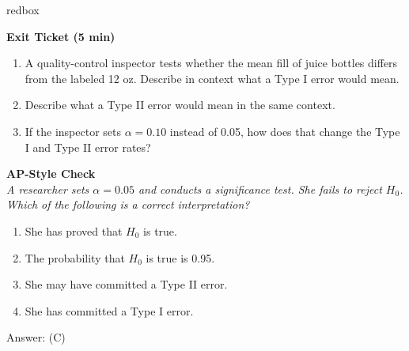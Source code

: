 \documentclass[10pt]{article}
\begin{document}
\begin{skillbox}{redbox}
\begin{minipage}[t]{0.48\linewidth}
    \textbf{Exit Ticket (5 min)}
    \begin{enumerate}
        \item A quality-control inspector tests whether the mean fill of juice bottles
              differs from the labeled 12 oz. Describe in context what a Type I error
              would mean.
        \item Describe what a Type II error would mean in the same context.
        \item If the inspector sets $\alpha = 0.10$ instead of 0.05, how does that
              change the Type I and Type II error rates?
    \end{enumerate}
\end{minipage}
\hfill
\begin{minipage}[t]{0.48\linewidth}
    \textbf{AP-Style Check}\\
    \textit{A researcher sets $\alpha = 0.05$ and conducts a significance test. She
    fails to reject $H_0$. Which of the following is a correct interpretation?}
    \begin{enumerate}[label=(\Alph*)]
        \item She has proved that $H_0$ is true.
        \item The probability that $H_0$ is true is 0.95.
        \item She may have committed a Type II error.
        \item She has committed a Type I error.
    \end{enumerate}
    Answer: (C)
\end{minipage}
\end{skillbox}
\end{document}
